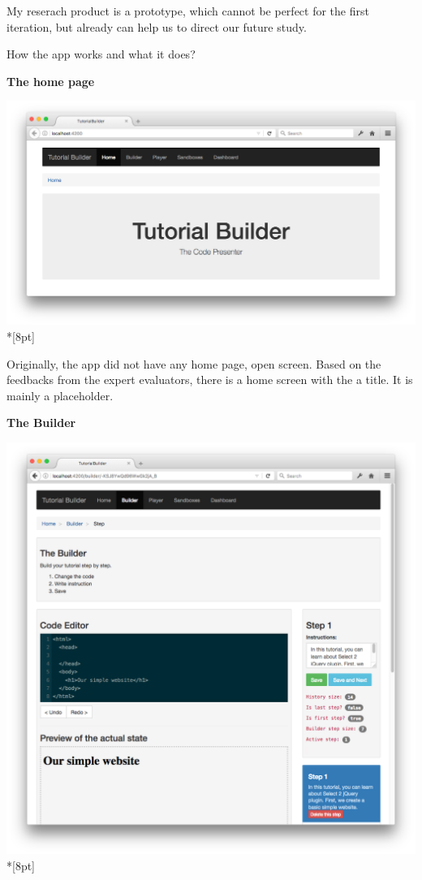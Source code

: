 \documentclass[12pt, a4paper, oneside, openright, medskipamount]{report}
\begin{document}
My reserach product is a prototype, which cannot be perfect for the first iteration, but already can help us to direct our future study.

How the app works and what it does?

\newpage

\textbf{The home page}

\includegraphics[width=1\textwidth]{assets/tour-screenshots/home-page.png}\\*[8pt]

Originally, the app did not have any home page, open screen. Based on the feedbacks from the expert evaluators, there is a home screen with the a title. It is mainly a placeholder.

\newpage

\textbf{The Builder}

\includegraphics[width=1\textwidth]{assets/tour-screenshots/the-builder.png}\\*[8pt]
\end{document}
